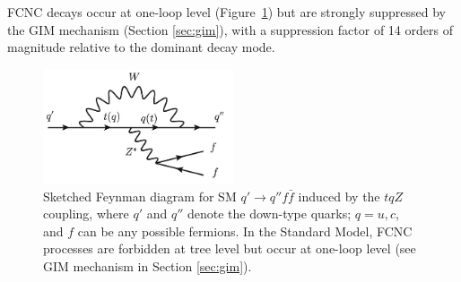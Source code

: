 FCNC decays occur at one-loop level (Figure~\ref{fig:tqZ_fey}) but are strongly suppressed by the GIM mechanism (Section \ref{sec:gim}), with a suppression factor of 14 orders of
magnitude relative to the dominant decay mode\cite{tcZ_sm}.
\begin{figure}[!h]
	\centering
	\includegraphics[width=0.5\textwidth]{Chapters/CH1/figures/tqZ_fey}
	\caption{Sketched Feynman diagram for SM $q' \rightarrow q'' f \bar{f}$ induced by the $tqZ$ coupling, where $q'$ and $q''$ denote the down-type quarks; $q = u, c$, and $f$ can be any possible fermions. In the Standard Model, FCNC processes are forbidden at tree level but occur at one-loop level (see GIM mechanism in Section \ref{sec:gim}).}
	\label{fig:tqZ_fey}
\end{figure}

